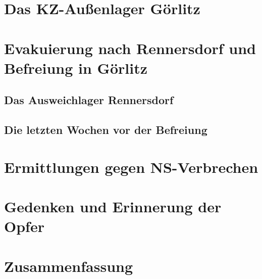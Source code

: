 \documentclass[a4paper,12pt,ngerman,
]{nisebook}
\begin{document}


\chapter{Das KZ-Außenlager Görlitz}


\chapter{Evakuierung nach Rennersdorf und Befreiung in Görlitz}

\section{Das Ausweichlager Rennersdorf}

\section{Die letzten Wochen vor der Befreiung}


\chapter{Ermittlungen gegen NS-Verbrechen}


\chapter{Gedenken und Erinnerung der Opfer}


\chapter{Zusammenfassung}

\end{document}
